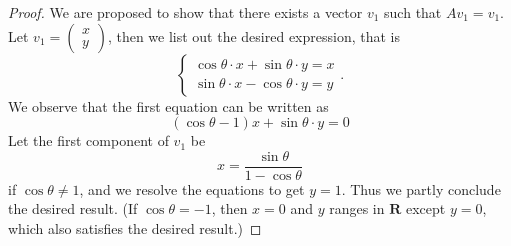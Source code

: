 {{\begin{solution}
\begin{proof}
            We are proposed to show that there exists a vector $v_1$ such that $Av_1 = v_1$. 
            Let $v_1 = \begin{pmatrix} x \\ y \end{pmatrix}$, then we list out the desired expression, that is 
            \begin{equation*}
                \begin{cases}
                    \cos \theta \cdot x + \sin \theta \cdot y = x \\ 
                    \sin \theta \cdot x - \cos \theta \cdot y = y 
                \end{cases}. 
            \end{equation*}
            We observe that the first equation can be written as 
            \begin{equation*}
                (\cos \theta - 1) x + \sin \theta \cdot y = 0 
            \end{equation*} 
            Let the first component of $v_1$ be 
            \begin{equation*}
                x = \frac{\sin \theta}{1 - \cos \theta} 
            \end{equation*} 
            if $\cos \theta \neq 1$, and we resolve the equations to get $y = 1$. 
            Thus we partly conclude the desired result. 
            (If $\cos \theta = -1$, then $x = 0$ and $y$ ranges in $\mathbf{R}$ except $y = 0$, which also satisfies the desired result.) 


\end{proof}
\end{solution}}}
